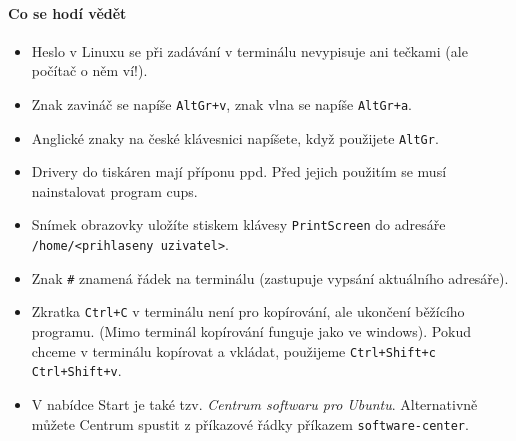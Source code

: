 \paragraph{Co se hodí vědět }

\begin{itemize}
	
	
\item Heslo v Linuxu se při zadávání v terminálu nevypisuje ani tečkami (ale počítač o něm ví!). 

\item Znak zavináč se napíše {\tt AltGr+v}, znak vlna se napíše {\tt AltGr+a}.

\item Anglické znaky na české klávesnici napíšete, když použijete {\tt AltGr}. 

\item Drivery do tiskáren mají příponu ppd. Před jejich použitím se musí nainstalovat program cups. 

\item Snímek obrazovky uložíte stiskem klávesy {\tt PrintScreen} do adresáře 
{\tt /home/<prihlaseny uzivatel>}. 

\item Znak {\tt \#} znamená řádek na terminálu (zastupuje vypsání aktuálního adresáře). 

\item Zkratka {\tt Ctrl+C} v terminálu není pro kopírování, ale ukončení běžícího programu. (Mimo terminál kopírování funguje jako ve windows). Pokud chceme v terminálu kopírovat a vkládat, použijeme {\tt Ctrl+Shift+c}  {\tt Ctrl+Shift+v}.

\item V nabídce Start je také tzv.  \textit{Centrum softwaru pro Ubuntu}. 
Alternativně můžete Centrum spustit z příkazové řádky příkazem \texttt{software-center}.
	
\end{itemize}


